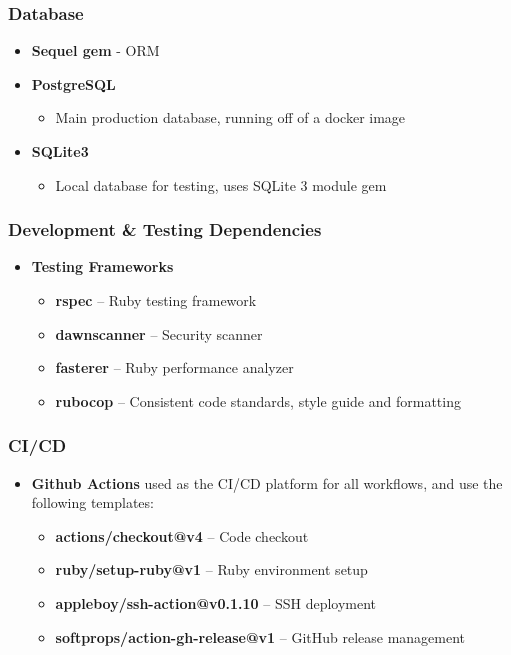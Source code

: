 \subsubsection{Database}
\begin{itemize}
    \item \textbf{Sequel gem} - ORM
    \item \textbf{PostgreSQL}
    \begin{itemize}
        \item Main production database, running off of a docker image
    \end{itemize}
    \item \textbf{SQLite3}
    \begin{itemize}
        \item Local database for testing, uses SQLite 3 module gem
    \end{itemize}
\end{itemize}

\subsubsection{Development \& Testing Dependencies}
\begin{itemize}
    \item \textbf{Testing Frameworks}
    \begin{itemize}
        \item \textbf{rspec} -- Ruby testing framework
        \item \textbf{dawnscanner} -- Security scanner
        \item \textbf{fasterer} -- Ruby performance analyzer
        \item \textbf{rubocop} -- Consistent code standards, style guide and formatting
    \end{itemize}
\end{itemize}

\subsubsection{CI/CD}
\begin{itemize}
    \item \textbf{Github Actions} used as the CI/CD platform for all workflows, and use the following templates:
    \begin{itemize}
        \item \textbf{actions/checkout@v4} -- Code checkout
        \item \textbf{ruby/setup-ruby@v1} -- Ruby environment setup
        \item \textbf{appleboy/ssh-action@v0.1.10} -- SSH deployment
        \item \textbf{softprops/action-gh-release@v1} -- GitHub release management
    \end{itemize}
\end{itemize}

